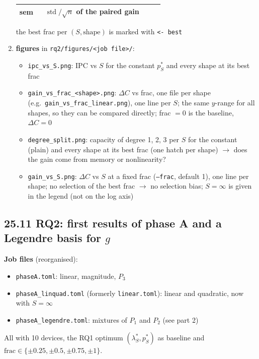 \begin{enumerate}
\begin{center}
\begin{tabular}{p{0.15\linewidth}p{0.7\linewidth}}
        sem & $\operatorname{std} / \sqrt{n}$ of the paired gain \\
        \hline
    \end{tabular}
    \end{center}
    the best frac per $(S, \text{shape})$ is marked with \texttt{<- best}
    \item \textbf{figures} in \texttt{rq2/figures/<job file>/}:
    \begin{itemize}
        \item \texttt{ipc\_vs\_S.png}: IPC vs $S$ for the constant $p^*_S$ and every shape at its best frac
        \item \texttt{gain\_vs\_frac\_<shape>.png}: $\Delta C$ vs frac, one file per shape (e.g.\
        \texttt{gain\_vs\_frac\_linear.png}), one line per $S$; the same $y$-range for all shapes, so they can be
        compared directly; frac $= 0$ is the baseline, $\Delta C = 0$
        \item \texttt{degree\_split.png}: capacity of degree 1, 2, 3 per $S$ for the constant (plain) and every shape
        at its best frac (one hatch per shape) $\to$ does the gain come from memory or nonlinearity?
        \item \texttt{gain\_vs\_S.png}: $\Delta C$ vs $S$ at a fixed frac (\texttt{--frac}, default 1), one line
        per shape; no selection of the best frac $\to$ no selection bias; $S = \infty$ is given in the legend
        (not on the log axis)
    \end{itemize}
\end{enumerate}

\subsection*{25.11 \quad RQ2: first results of phase A and a Legendre basis for $g$}
\phantomsection
\label{sec:rq2-phaseA-results}

\textbf{Job files} (reorganised):
\begin{itemize}
    \item \texttt{phaseA.toml}: linear, magnitude, $P_3$
    \item \texttt{phaseA\_linquad.toml} (formerly \texttt{linear.toml}): linear and quadratic, now with $S = \infty$
    \item \texttt{phaseA\_legendre.toml}: mixtures of $P_1$ and $P_2$ (see part 2)
\end{itemize}
All with 10 devices, the RQ1 optimum $(\lambda^*_S, p^*_S)$ as baseline and
$\text{frac} \in \{\pm 0.25, \pm 0.5, \pm 0.75, \pm 1\}$.

